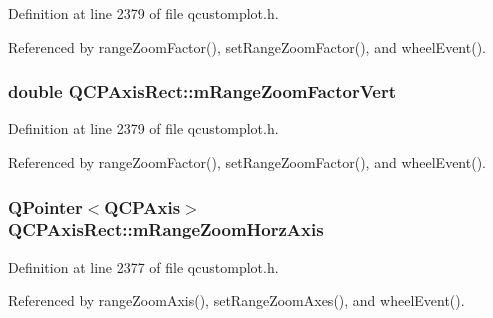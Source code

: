 Definition at line 2379 of file qcustomplot.\+h.



Referenced by range\+Zoom\+Factor(), set\+Range\+Zoom\+Factor(), and wheel\+Event().

\hypertarget{class_q_c_p_axis_rect_a32f063629581d5bf82b12769940b34ad}{}
\subsubsection[{m\+Range\+Zoom\+Factor\+Vert}]{\setlength{\rightskip}{0pt plus 5cm}double Q\+C\+P\+Axis\+Rect\+::m\+Range\+Zoom\+Factor\+Vert\hspace{0.3cm}{\ttfamily [protected]}}\label{class_q_c_p_axis_rect_a32f063629581d5bf82b12769940b34ad}


Definition at line 2379 of file qcustomplot.\+h.



Referenced by range\+Zoom\+Factor(), set\+Range\+Zoom\+Factor(), and wheel\+Event().

\hypertarget{class_q_c_p_axis_rect_ae22f882bab20518559f3fbb84243d0ab}{}
\subsubsection[{m\+Range\+Zoom\+Horz\+Axis}]{\setlength{\rightskip}{0pt plus 5cm}Q\+Pointer$<${\bf Q\+C\+P\+Axis}$>$ Q\+C\+P\+Axis\+Rect\+::m\+Range\+Zoom\+Horz\+Axis\hspace{0.3cm}{\ttfamily [protected]}}\label{class_q_c_p_axis_rect_ae22f882bab20518559f3fbb84243d0ab}


Definition at line 2377 of file qcustomplot.\+h.



Referenced by range\+Zoom\+Axis(), set\+Range\+Zoom\+Axes(), and wheel\+Event().

\hypertarget{class_q_c_p_axis_rect_a8b9acd16a203a9692bd35a9465f54bc1}{}

